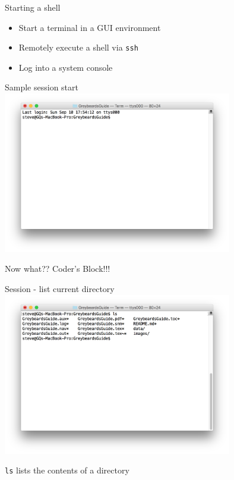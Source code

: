 \documentclass[t]{beamer}
\begin{document}
\begin{frame}{Starting a shell}
  \begin{itemize}
  \item Start a terminal in a GUI environment
  \item Remotely execute a shell via \texttt{ssh}
  \item Log into a system console
  \end{itemize}
  \note{}
\end{frame}

\begin{frame}{Sample session start}
  \includegraphics[width=10cm,scale=0.4]{images/newtty-1.png}

  Now what?? Coder's Block!!!
  \note{}
\end{frame}

\begin{frame}{Session - list current directory}
  \includegraphics[width=10cm,scale=0.4]{images/newtty-2.png}

  \texttt{ls} lists the contents of a directory
  \note{}
\end{frame}
\end{document}
